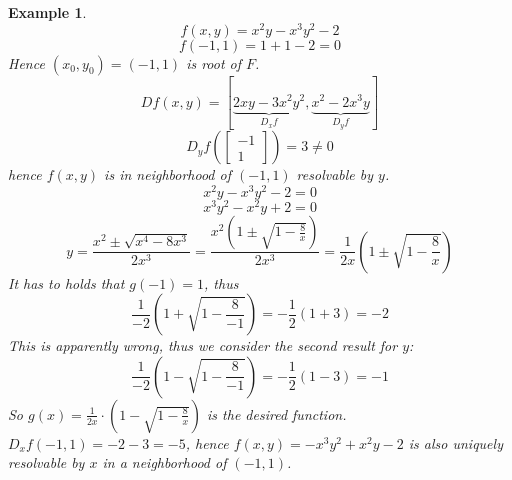 \documentclass{article}
\newtheorem{example}{Example}  \numberwithin{example}{section}
\begin{document}
\begin{example}
  \[ f(x, y) = x^2 y - x^3 y^2 - 2 \]
  \[ f(-1, 1) = 1 + 1 - 2 = 0 \]
  Hence $(x_0, y_0) = (-1, 1)$ is root of $F$.
  \[ Df(x, y) = \left[\underbrace{2xy - 3x^2 y^2}_{D_x f}, \underbrace{x^2 - 2x^3 y}_{D_y f}\right] \]
  \[ D_y f(\begin{bmatrix} -1 \\ 1 \end{bmatrix}) = 3 \neq 0 \]
  hence $f(x, y)$ is in neighborhood of $(-1, 1)$ resolvable by $y$.
  \[ x^2 y - x^3 y^2 - 2 = 0 \]
  \[ x^3 y^2 - x^2 y + 2 = 0 \]
  \[ y = \frac{x^2 \pm \sqrt{x^4 - 8x^3}}{2x^3} = \frac{x^2 (1 \pm \sqrt{1 - \frac{8}{x}})}{2x^3} = \frac{1}{2x} \left(1 \pm \sqrt{1 - \frac8x}\right) \]
  It has to holds that $g(-1) = 1$, thus
  \[ \frac1{-2} \left(1 + \sqrt{1 - \frac{8}{-1}}\right) = -\frac12 (1 + 3) = -2 \]
  This is apparently wrong, thus we consider the second result for $y$:
  \[ \frac1{-2} \left(1 - \sqrt{1 - \frac{8}{-1}}\right) = -\frac12 (1 - 3) = -1 \]
  So $g(x) = \frac1{2x} \cdot \left(1 - \sqrt{1 - \frac8x}\right)$ is the desired function.
  $D_x f(-1, 1) = -2 - 3 = -5$, hence $f(x, y) = -x^3 y^2 + x^2 y - 2$ is also uniquely resolvable by $x$ in a neighborhood of $(-1, 1)$.
\end{example}
\end{document}
